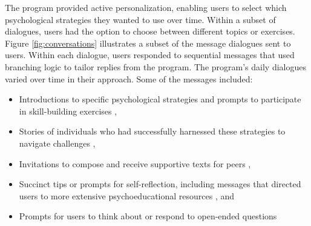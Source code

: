 The program provided active personalization, enabling users to select which psychological strategies they wanted to use over time. Within a subset of dialogues, users had the option to choose between different topics or exercises.
Figure \ref{fig:conversations} illustrates a subset of the message dialogues sent to users. Within each dialogue, users responded to sequential messages that used branching logic to tailor replies from the program. The program's daily dialogues varied over time in their approach.
Some of the messages included:
\begin{itemize}
    \item Introductions to specific psychological strategies and prompts to participate in skill-building exercises \cite{meyerhoff2022system},
    \item Stories of individuals who had successfully harnessed these strategies to navigate challenges \cite{bhattacharjee2022kind},
    \item Invitations to compose and receive supportive texts for peers \cite{meyerhoff2022system},
    \item Succinct tips or prompts for self-reflection, including messages that directed users to more extensive psychoeducational resources \cite{bhattacharjee2023investigating}, and 
    \item Prompts for users to think about or respond to open-ended questions \cite{bhattacharjee2023investigating} 
\end{itemize}
